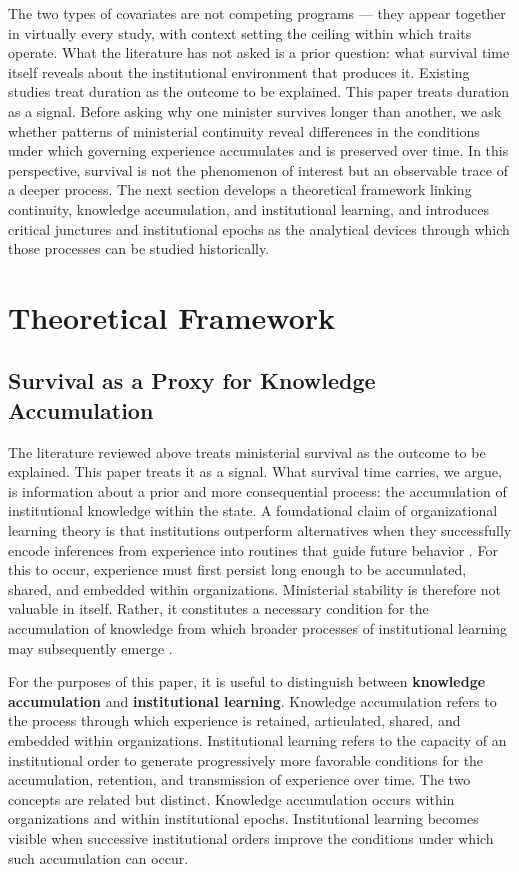 \documentclass[doc, 12pt, a4paper,floatsintext]{apa7}
\begin{document}
The two types of covariates are not competing programs --- they appear together in virtually every study, with context setting the ceiling within which traits operate. What the literature has not asked is a prior question: what survival time itself reveals about the institutional environment that produces it. Existing studies treat duration as the outcome to be explained. This paper treats duration as a signal. Before asking why one minister survives longer than another, we ask whether patterns of ministerial continuity reveal differences in the conditions under which governing experience accumulates and is preserved over time. In this perspective, survival is not the phenomenon of interest but an observable trace of a deeper process. The next section develops a theoretical framework linking continuity, knowledge accumulation, and institutional learning, and introduces critical junctures and institutional epochs as the analytical devices through which those processes can be studied historically.


\section{Theoretical Framework}

\subsection{Survival as a Proxy for Knowledge Accumulation}

The literature reviewed above treats ministerial survival as the outcome to be explained. This paper treats it as a signal. What survival time carries, we argue, is information about a prior and more consequential process: the accumulation of institutional knowledge within the state. A foundational claim of organizational learning theory is that institutions outperform alternatives when they successfully encode inferences from experience into routines that guide future behavior \parencite[319--320]{levitt_organizational_1988}. For this to occur, experience must first persist long enough to be accumulated, shared, and embedded within organizations. Ministerial stability is therefore not valuable in itself. Rather, it constitutes a necessary condition for the accumulation of knowledge from which broader processes of institutional learning may subsequently emerge \parencite{nonaka_knowledge-creating_1998}.

For the purposes of this paper, it is useful to distinguish between \textbf{knowledge accumulation} and \textbf{institutional learning}. Knowledge accumulation refers to the process through which experience is retained, articulated, shared, and embedded within organizations. Institutional learning refers to the capacity of an institutional order to generate progressively more favorable conditions for the accumulation, retention, and transmission of experience over time. The two concepts are related but distinct. Knowledge accumulation occurs within organizations and within institutional epochs. Institutional learning becomes visible when successive institutional orders improve the conditions under which such accumulation can occur.
\end{document}
